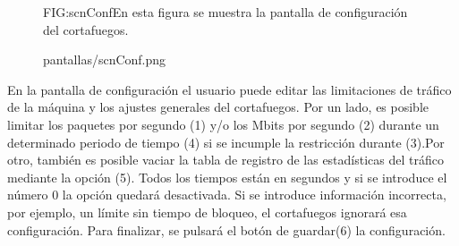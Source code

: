 \begin{figure}[Pantalla de configuración]{FIG:scnConf}{En esta figura se muestra la pantalla de configuración del cortafuegos.}
  \begin{image}{}{}{pantallas/scnConf.png}
  \end{image}
\end{figure}

En la pantalla de configuración el usuario puede editar las limitaciones de tráfico de la máquina y los ajustes generales del cortafuegos. Por un lado, es posible limitar los paquetes por segundo (1) y/o los Mbits por segundo (2) durante un determinado periodo de tiempo (4) si se incumple la restricción durante (3).Por otro, también es posible vaciar la tabla de registro de las estadísticas del tráfico mediante la opción (5). Todos los tiempos están en segundos y si se introduce el número 0 la opción quedará desactivada. Si se introduce información incorrecta, por ejemplo, un límite sin tiempo de bloqueo, el cortafuegos ignorará esa configuración. Para finalizar, se pulsará el botón de guardar(6) la configuración. 